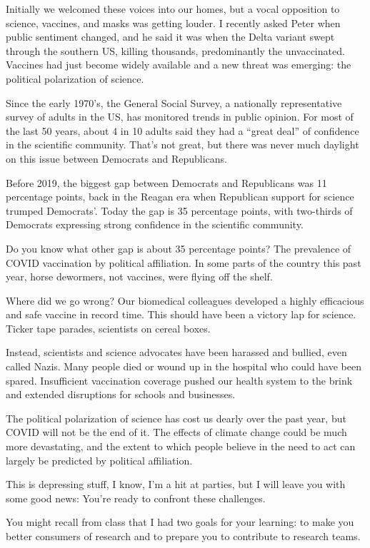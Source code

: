 \documentclass[
  letterpaper,
  DIV=11,
  numbers=noendperiod,
  oneside]{scrreprt}
\begin{document}
Initially we welcomed these voices into our homes, but a vocal
opposition to science, vaccines, and masks was getting louder. I
recently asked Peter when public sentiment changed, and he said it was
when the Delta variant swept through the southern US, killing thousands,
predominantly the unvaccinated. Vaccines had just become widely
available and a new threat was emerging: the political polarization of
science.

Since the early 1970's, the General Social Survey, a nationally
representative survey of adults in the US, has monitored trends in
public opinion. For most of the last 50 years, about 4 in 10 adults said
they had a ``great deal'' of confidence in the scientific community.
That's not great, but there was never much daylight on this issue
between Democrats and Republicans.

Before 2019, the biggest gap between Democrats and Republicans was 11
percentage points, back in the Reagan era when Republican support for
science trumped Democrats'. Today the gap is 35 percentage points, with
two-thirds of Democrats expressing strong confidence in the scientific
community.

Do you know what other gap is about 35 percentage points? The prevalence
of COVID vaccination by political affiliation. In some parts of the
country this past year, horse dewormers, not vaccines, were flying off
the shelf.

Where did we go wrong? Our biomedical colleagues developed a highly
efficacious and safe vaccine in record time. This should have been a
victory lap for science. Ticker tape parades, scientists on cereal
boxes.

Instead, scientists and science advocates have been harassed and
bullied, even called Nazis. Many people died or wound up in the hospital
who could have been spared. Insufficient vaccination coverage pushed our
health system to the brink and extended disruptions for schools and
businesses.

The political polarization of science has cost us dearly over the past
year, but COVID will not be the end of it. The effects of climate change
could be much more devastating, and the extent to which people believe
in the need to act can largely be predicted by political affiliation.

This is depressing stuff, I know, I'm a hit at parties, but I will leave
you with some good news: You're ready to confront these challenges.

You might recall from class that I had two goals for your learning: to
make you better consumers of research and to prepare you to contribute
to research teams.
\end{document}
